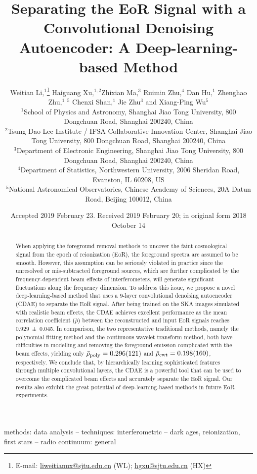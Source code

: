 \documentclass[fleqn,usenatbib]{mnras}
\title[EoR Signal Separation with a CDAE]{%
  Separating the EoR Signal with a Convolutional Denoising Autoencoder:
  A Deep-learning-based Method
}
\author[Li~et~al.]{%
Weitian Li,$^{1}$\thanks{E-mail:
  \href{mailto:liweitianux@sjtu.edu.cn}{liweitianux@sjtu.edu.cn} (WL);
  \href{mailto:hgxu@sjtu.edu.cn}{hgxu@sjtu.edu.cn} (HX)}
Haiguang Xu,$^{1,2}$\footnotemark[1]
Zhixian Ma,$^{3}$
Ruimin Zhu,$^{4}$
Dan Hu,$^{1}$
Zhenghao Zhu,$^{1}$
\newauthor  %
\editone{Junhua Gu,}$^{5}$
Chenxi Shan,$^{1}$
Jie Zhu$^{3}$
and
Xiang-Ping Wu$^{5}$
\\
$^{1}${School of Physics and Astronomy,
  Shanghai Jiao Tong University,
  800 Dongchuan Road, Shanghai 200240, China} \\
$^{2}${Tsung-Dao Lee Institute / IFSA Collaborative Innovation Center,
  Shanghai Jiao Tong University,
  800 Dongchuan Road, Shanghai 200240, China} \\
$^{3}${Department of Electronic Engineering,
  Shanghai Jiao Tong University,
  800 Dongchuan Road, Shanghai 200240, China} \\
$^{4}${Department of Statistics,
  Northwestern University,
  2006 Sheridan Road, Evanston, IL 60208, US} \\
$^{5}${National Astronomical Observatories,
  Chinese Academy of Sciences,
  20A Datun Road, Beijing 100012, China}
}
\date{%
  Accepted 2019 February 23.
  Received 2019 February 20;
  in original form 2018 October 14
}
\newcommand{\R}[1]{\mathrm{#1}}
\newcommand{\editone}[1]{{\leavevmode\color{cyan}#1}}
\newcommand{\edittwo}[1]{{\leavevmode\color{magenta}#1}}
\begin{document}
\label{firstpage}
\pagerange{\pageref{firstpage}--\pageref{lastpage}}
\maketitle

%
%
\begin{abstract}
When applying the foreground removal methods to uncover the
\editone{faint cosmological signal from the epoch of reionization (EoR)},
the foreground spectra are assumed to be smooth.
However, this assumption can be seriously violated in practice since
the unresolved or mis-subtracted foreground sources, which are further
complicated by the frequency-dependent beam effects of interferometers,
will generate significant fluctuations along the frequency dimension.
To address this issue, we propose a novel deep-learning-based method
that uses a 9-layer convolutional denoising autoencoder (CDAE) to
separate the EoR signal.
After being trained on the SKA images simulated with realistic beam
effects, the CDAE achieves excellent performance as the mean correlation
coefficient ($\bar{\rho}$) between the reconstructed and input EoR
signals reaches \editone{\num{0.929 +- 0.045}}.
In comparison,
\editone{%
the two representative traditional methods, namely the polynomial
fitting method and the continuous wavelet transform method, both have
\edittwo{difficulties in modelling and removing the foreground emission
complicated with the beam effects},
yielding only
$\bar{\rho}_{\R{poly}} = \num{0.296 +- 0.121}$ and
$\bar{\rho}_{\R{cwt}} = \num{0.198 +- 0.160}$, respectively.} %
We conclude that, by hierarchically learning sophisticated features
through multiple convolutional layers, the CDAE is a powerful tool that
can be used to overcome the complicated beam effects and accurately
separate the EoR signal.
\edittwo{Our results also} exhibit the great
potential of deep-learning-based methods in future EoR experiments.
\end{abstract}

\begin{keywords}
methods: data analysis --
techniques: interferometric --
dark ages, reionization, first stars --
radio continuum: general
\end{keywords}


\end{document}
